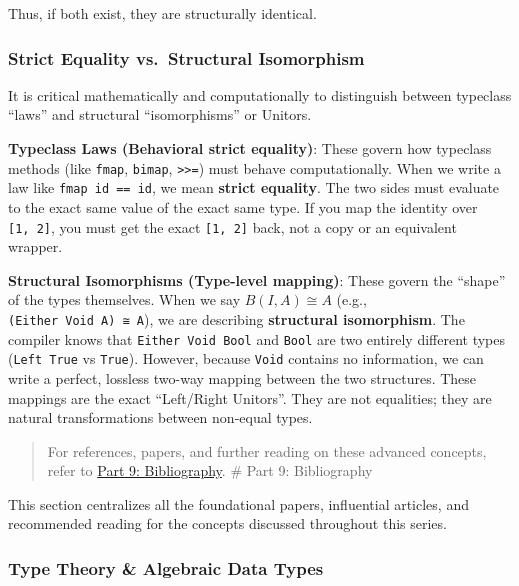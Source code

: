 \documentclass[
]{article}
\begin{document}
Thus, if both exist, they are structurally identical.

\subsubsection{Strict Equality vs.~Structural
Isomorphism}\label{strict-equality-vs.-structural-isomorphism}

It is critical mathematically and computationally to distinguish between
typeclass ``laws'' and structural ``isomorphisms'' or Unitors.

\textbf{Typeclass Laws (Behavioral strict equality)}: These govern how
typeclass methods (like \texttt{fmap}, \texttt{bimap},
\texttt{\textgreater{}\textgreater{}=}) must behave computationally.
When we write a law like \texttt{fmap\ id\ ==\ id}, we mean
\textbf{strict equality}. The two sides must evaluate to the exact same
value of the exact same type. If you map the identity over
\texttt{{[}1,\ 2{]}}, you must get the exact \texttt{{[}1,\ 2{]}} back,
not a copy or an equivalent wrapper.

\textbf{Structural Isomorphisms (Type-level mapping)}: These govern the
``shape'' of the types themselves. When we say \(B(I, A) \cong A\)
(e.g., \texttt{(Either\ Void\ A)\ ≅\ A}), we are describing
\textbf{structural isomorphism}. The compiler knows that
\texttt{Either\ Void\ Bool} and \texttt{Bool} are two entirely different
types (\texttt{Left\ True} vs \texttt{True}). However, because
\texttt{Void} contains no information, we can write a perfect, lossless
two-way mapping between the two structures. These mappings are the exact
``Left/Right Unitors''. They are not equalities; they are natural
transformations between non-equal types.

\begin{quote}
For references, papers, and further reading on these advanced concepts,
refer to \href{09_bibliography.md}{Part 9: Bibliography}. \# Part 9:
Bibliography
\end{quote}

This section centralizes all the foundational papers, influential
articles, and recommended reading for the concepts discussed throughout
this series.

\subsubsection{Type Theory \& Algebraic Data
Types}\label{type-theory-algebraic-data-types}
\end{document}
